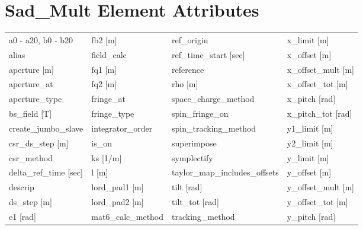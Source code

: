  \section{Sad_Mult Element Attributes}
 \label{s:list.sad.mult}
 
 \begin{tabular}{llll} \toprule
a0 - a20, b0 - b20               & fb2 [m]                          & ref_origin                       & x_limit [m]                      \\
alias                            & field_calc                       & ref_time_start [sec]             & x_offset [m]                     \\
aperture [m]                     & fq1 [m]                          & reference                        & x_offset_mult [m]                \\
aperture_at                      & fq2 [m]                          & rho [m]                          & x_offset_tot [m]                 \\
aperture_type                    & fringe_at                        & space_charge_method              & x_pitch [rad]                    \\
bs_field [T]                     & fringe_type                      & spin_fringe_on                   & x_pitch_tot [rad]                \\
create_jumbo_slave               & integrator_order                 & spin_tracking_method             & y1_limit [m]                     \\
csr_ds_step [m]                  & is_on                            & superimpose                      & y2_limit [m]                     \\
csr_method                       & ks [1/m]                         & symplectify                      & y_limit [m]                      \\
delta_ref_time [sec]             & l [m]                            & taylor_map_includes_offsets      & y_offset [m]                     \\
descrip                          & lord_pad1 [m]                    & tilt [rad]                       & y_offset_mult [m]                \\
ds_step [m]                      & lord_pad2 [m]                    & tilt_tot [rad]                   & y_offset_tot [m]                 \\
e1 [rad]                         & mat6_calc_method                 & tracking_method                  & y_pitch [rad]                    \\

\end{tabular}
